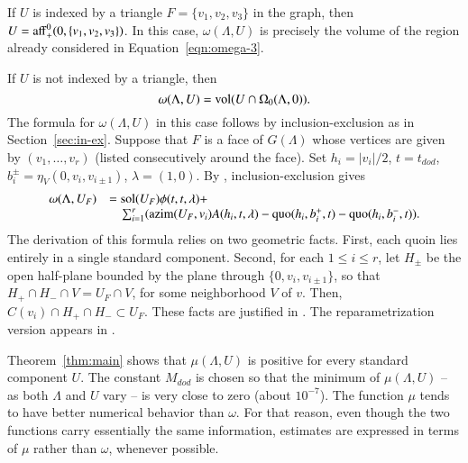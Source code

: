 \documentclass{article} %
\begin{document}
If $U$ is indexed by a triangle $F=\{v_1,v_2,v_3\}$ in the graph,
then $U = {\operatorname{aff}}_+^0(0,\{v_1,v_2,v_3\})$.  In this case,
$\omega(\Lambda,U)$ is precisely the volume of the region
already considered in Equation~\ref{eqn:omega-3}.

If $U$ is not indexed by a triangle, then
   $$\omega(\Lambda,U) = {\operatorname{vol}}(U\cap\Omega_0(\Lambda,0)).$$
The formula for $\omega(\Lambda,U)$ in this case follows
by inclusion-exclusion as in Section~\ref{sec:in-ex}.  Suppose
that $F$ is a face of $G(\Lambda)$ whose vertices are given
by $(v_1,\ldots,v_r)$ (listed consecutively around the face).
Set $h_i=|v_i|/2$, $t=t_{dod}$, $b^\pm_{i}=\eta_V(0,v_i,v_{i\pm 1})$,
$\lambda=(1,0)$.
By \cite[Eqn.~7.12]{DCG}, inclusion-exclusion gives
\begin{equation}\label{eqn:in-ex-U}
\begin{array}{lll}
\omega(\Lambda,U_F) &= \operatorname{sol}(U_F) \phi(t,t,\lambda) + \\
&\quad \sum_{i=1}^r ({\operatorname{azim}}(U_F,v_i) A(h_i,t,\lambda) - \operatorname{quo}(h_i,b_i^+,t) - 
\operatorname{quo}(h_i,b_i^-,t)).
\end{array}
\end{equation}
The derivation of this formula relies on two geometric facts.  First,
each quoin lies entirely in a single standard component.
Second, for each $1\le i\le r$, let $H_{\pm}$ be the open half-plane
bounded by the plane through $\{0,v_i,v_{i\pm 1}\}$, so
that $H_+\cap H_- \cap V = U_F\cap V$, for some neighborhood $V$ of $v$.
Then,   $C(v_i)\cap H_+\cap H_-\subset U_F$.
These facts are justified in \cite[Lemma~12.5]{DCG}.  The reparametrization
version appears in \cite{arx}.

Theorem~\ref{thm:main} shows that $\mu(\Lambda,U)$ is positive
for every standard component $U$.  The constant
$M_{dod}$ is chosen so that the minimum of $\mu(\Lambda,U)$ -- as
both $\Lambda$ and $U$  vary -- is very close to zero (about $10^{-7}$).
The function $\mu$ tends to have better numerical behavior
than $\omega$.  For that reason, even though the two
functions carry essentially the same information,
estimates are expressed in terms
of $\mu$ rather than $\omega$, whenever possible.
\end{document}
